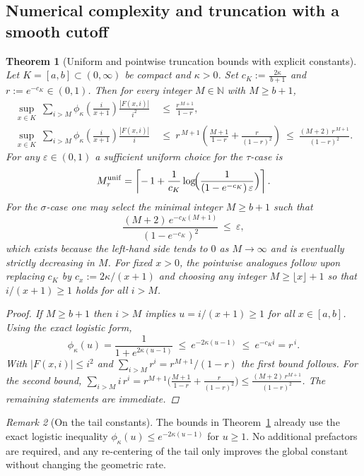 \documentclass[11pt,a4paper]{amsart}
\theoremstyle{plain}
\newtheorem{theorem}{Theorem}[section]
\theoremstyle{definition}
\theoremstyle{remark}
\newtheorem{remark}[theorem]{Remark}
\begin{document}
\FloatBarrier

\subsection{Numerical complexity and truncation with a smooth cutoff}

\begin{theorem}[Uniform and pointwise truncation bounds with explicit constants]\label{thm:truncation}
Let $K=[a,b]\subset(0,\infty)$ be compact and $\kappa>0$. Set $c_K:=\frac{2\kappa}{\,b+1\,}$ and $r:=e^{-c_K}\in(0,1)$. Then for every integer $M\in\mathbb{N}$ with $M\ge b+1$,
\begin{align*}
\sup_{x\in K}\ \sum_{i>M}\phi_\kappa\!\left(\frac{i}{x+1}\right)\frac{|F(x,i)|}{i^2}
&\ \le\ \frac{r^{\,M+1}}{1-r},\\[4pt]
\sup_{x\in K}\ \sum_{i>M}\phi_\kappa\!\left(\frac{i}{x+1}\right)\frac{|F(x,i)|}{i}
&\ \le\ r^{\,M+1}\!\left(\frac{M+1}{1-r}+\frac{r}{(1-r)^2}\right)
\ \le\ \frac{(M+2)\,r^{\,M+1}}{(1-r)^2}.
\end{align*}
For any $\varepsilon\in(0,1)$ a sufficient uniform choice for the $\tau$-case is
\[
M_\tau^{\mathrm{unif}}=\left\lceil -\,1+\frac{1}{c_K}\log\!\Bigl(\frac{1}{(1-e^{-c_K})\,\varepsilon}\Bigr)\right\rceil.
\]
For the $\sigma$-case one may select the minimal integer $M\ge b+1$ such that
\[
\frac{(M+2)\,e^{-c_K(M+1)}}{(1-e^{-c_K})^2}\ \le\ \varepsilon,
\]
which exists because the left-hand side tends to $0$ as $M\to\infty$ and is eventually strictly decreasing in $M$. For fixed $x>0$, the pointwise analogues follow upon replacing $c_K$ by $c_x:=2\kappa/(x+1)$ and choosing any integer $M\ge \lfloor x\rfloor+1$ so that $i/(x+1)\ge 1$ holds for all $i>M$.
\begin{proof}
If $M\ge b+1$ then $i>M$ implies $u=i/(x+1)\ge 1$ for all $x\in[a,b]$. Using the exact logistic form,
\[
\phi_\kappa(u)=\frac{1}{1+e^{2\kappa(u-1)}}\ \le\ e^{-2\kappa(u-1)}\ \le\ e^{-c_K i}=r^{\,i}.
\]
With $|F(x,i)|\le i^2$ and $\sum_{i>M}r^i=r^{M+1}/(1-r)$ the first bound follows. For the second bound, $\sum_{i>M} i\,r^i=r^{M+1}\bigl(\frac{M+1}{1-r}+\frac{r}{(1-r)^2}\bigr)\le \frac{(M+2)\,r^{M+1}}{(1-r)^2}$. The remaining statements are immediate.
\end{proof}
\end{theorem}

\begin{remark}[On the tail constants]
The bounds in Theorem~\ref{thm:truncation} already use the exact logistic inequality $\phi_\kappa(u)\le e^{-2\kappa(u-1)}$ for $u\ge 1$. No additional prefactors are required, and any re-centering of the tail only improves the global constant without changing the geometric rate.
\end{remark}
\end{document}
